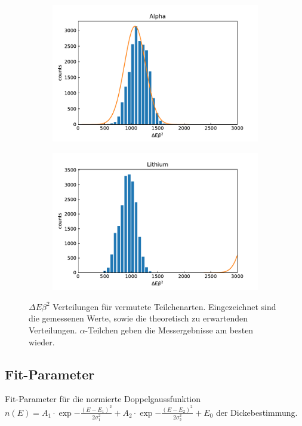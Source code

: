 \begin{figure}[ht]
	\begin{subfigure}[c]{0.45\textwidth}
		\centering
		\includegraphics[width=\textwidth]{dat/debeta_Alpha.pdf}
	\end{subfigure}
	\begin{subfigure}[c]{0.45\textwidth}
		\centering
		\includegraphics[width=\textwidth]{dat/debeta_Lithium.pdf}
	\end{subfigure}
	
	\caption{$\Delta E \beta^2$ Verteilungen für vermutete Teilchenarten. Eingezeichnet sind die gemessenen Werte, sowie die theoretisch zu erwartenden Verteilungen. $\alpha$-Teilchen geben die Messergebnisse am besten wieder.}
	\label{fig:debeta_full}
\end{figure}

\subsection{Fit-Parameter}
\label{sec:fitval}

\begin{table}[H]
	\centering
	\caption{Fit-Parameter für die normierte Doppelgaussfunktion \mbox{$n(E) = A_1 \cdot \exp{-\frac{(E - E_1)^2}{2 \sigma_1^2}} + A_2 \cdot \exp{-\frac{(E - E_2)^2}{2 \sigma_2^2}} + E_0$} der Dickebestimmung.}
	\label{tab:fitval1}
	
\end{table}